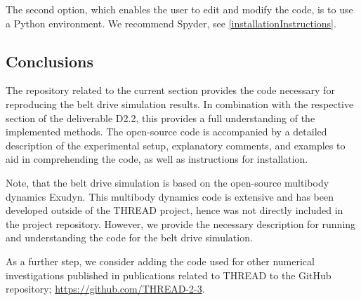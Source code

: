 The second option, which enables the user to edit and modify the code, is to use a Python environment. We recommend Spyder, see \ref{installationInstructions}.

\subsection{Conclusions}
The repository related to the current section provides the code necessary for reproducing the belt drive simulation results. 
In combination with the respective section of the deliverable D2.2, this provides a full understanding of the implemented methods. 
The open-source code is accompanied by a detailed description of the experimental setup, explanatory comments, and examples to aid in comprehending the code, as well as instructions for installation. 

Note, that the belt drive simulation is based on the open-source multibody dynamics Exudyn. This multibody dynamics code is extensive and has been developed outside of the THREAD project, hence was not directly included in the project repository. However, we provide the necessary description for running and understanding the code for the belt drive simulation.

As a further step, we consider adding the code used for other numerical investigations published in publications related to THREAD to the GitHub repository; \url{https://github.com/THREAD-2-3}.
